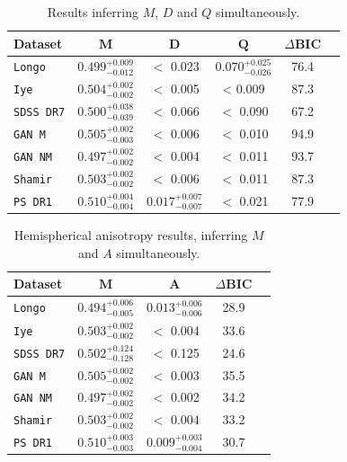 \documentclass[fleqn,usenatbib,nofootinbib]{mnras}
\begin{document}
\begin{table}
\centering
\caption{Results inferring $M$, $D$ and $Q$ simultaneously.}
\label{tab:long2}
\renewcommand{\arraystretch}{1.5} %
\begin{tabular}{|l|c|c|c|c|c|}
\hline
\textbf{Dataset} & $\mathbf{M}$ & $\mathbf{D}$ & $\mathbf{Q}$ & \textbf{$\Delta$BIC} \\
\hline
\texttt{Longo} & $0.499^{+0.009}_{-0.012}$ & $<$ 0.023 & $0.070^{+0.025}_{-0.026}$ & 76.4 \\
\texttt{Iye} & $0.504^{+0.002}_{-0.002}$ & $<$ 0.005 & < 0.009 & 87.3 \\
\texttt{SDSS DR7} & $0.500^{+0.038}_{-0.039}$ & $<$ 0.066 & $<$ 0.090 & 67.2 \\
\texttt{GAN M} & $0.505^{+0.002}_{-0.003}$ & $<$ 0.006 & $<$ 0.010 & 94.9 \\
\texttt{GAN NM} & $0.497^{+0.002}_{-0.002}$ & $<$ 0.004 & $<$ 0.011 & 93.7 \\
\texttt{Shamir} & $0.503^{+0.002}_{-0.002}$ & $<$ 0.006 & $<$ 0.011 & 87.3 \\
\texttt{PS DR1} & $0.510^{+0.004}_{-0.004}$ & $0.017^{+0.007}_{-0.007}$ & $<$ 0.021 & 77.9 \\
\hline
\end{tabular}
\end{table}

\begin{table}
\centering
\caption{Hemispherical anisotropy results, inferring $M$ and $A$ simultaneously.}
\label{tab:long_5}
\renewcommand{\arraystretch}{1.5} %
\begin{tabular}{|l|c|c|c|c|}
\hline
\textbf{Dataset} & $\mathbf{M}$ & $\mathbf{A}$ & \textbf{$\Delta$BIC} \\
\hline
\texttt{Longo} & $0.494^{+0.006}_{-0.005}$ & $0.013^{+0.006}_{-0.006}$ & 28.9 \\
\texttt{Iye} & $0.503^{+0.002}_{-0.002}$ & $<$ 0.004 & 33.6 \\
\texttt{SDSS DR7} & $0.502^{+0.124}_{-0.128}$ & $<$ 0.125 & 24.6 \\
\texttt{GAN M} & $0.505^{+0.002}_{-0.002}$ & $<$ 0.003 & 35.5 \\
\texttt{GAN NM} & $0.497^{+0.002}_{-0.002}$ & $<$ 0.002 & 34.2 \\
\texttt{Shamir} & $0.503^{+0.002}_{-0.002}$ & $<$ 0.004 & 33.2 \\
\texttt{PS DR1} & $0.510^{+0.003}_{-0.003}$ & $0.009^{+0.003}_{-0.004}$ & 30.7 \\
\hline
\end{tabular}
\end{table}
\end{document}
